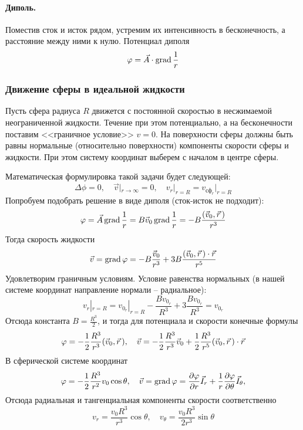 \paragraph{Диполь.} Поместив сток и исток рядом, устремим их интенсивность в бесконечность, а расстояние между ними к нулю. Потенциал диполя
\begin{equation}
    \varphi = \vec{A} \cdot \operatorname{grad} \frac{1}{r}
\end{equation}

\subsubsection{Движение сферы в идеальной жидкости}
Пусть сфера радиуса $R$ движется с постоянной скоростью в несжимаемой 
неограниченной жидкости. Течение при этом потенциально, а на бесконечности поставим <<граничное условие>> $v=0$. На поверхности сферы должны быть равны нормальные (относительно поверхности) компоненты скорости сферы и жидкости. При этом систему координат выберем с началом в центре сферы. 

Математическая формулировка такой задачи будет следующей:
\begin{equation}
    \Delta \phi = 0, \quad
    \vec{v} |_{r\to \infty}=0, \quad
    v_r |_{r=R}=v_{\text{сф}_r}|_{r=R}
\end{equation}
Попробуем подобрать решение в виде диполя (сток-исток не подходит):
\begin{equation}
    \varphi = \vec{A} \operatorname{grad} \frac{1}{r} = B \vec{v}_0 \operatorname{grad} \frac{1}{r}=
    -B \frac{\qty(\vec{v}_0,\vec{r}\,)}{r^3}
\end{equation}
Тогда скорость жидкости
\begin{equation}
    \vec{v} = \operatorname{grad} \varphi = -B \frac{\vec{v}_0}{r^3} +
    3B \frac{(\vec{v}_0,\vec{r}\,)\cdot \vec{r}}{r^5}
\end{equation}
Удовлетворим граничным условиям. Условие равенства нормальных (в нашей системе координат направление нормали -- радиальное):
\begin{equation}
    v_r |_{r=R}= v_{0_r}|_{r=R}
    -\frac{B{v_{0_r}}}{R^3}
    +3\frac{B v_{0_r}}{R^3} = v_{0_r} 
\end{equation}
Отсюда константа $B=\frac{R^3}{2}$, и тогда для потенциала и скорости конечные формулы
\begin{equation}
    \varphi = -\frac{1}{2} \frac{R^3}{r^3} \qty(\vec{v}_0,\vec{r}\,), \quad
    \vec{v} = -\frac{1}{2} \frac{R^3}{r^3} \vec{v}_0
    +\frac{1}{2} \frac{R^3}{r^5} (\vec{v}_0,\vec{r}\,)\cdot \vec{r}
\end{equation}
В сферической системе координат
\begin{equation}
    \varphi = -\frac{1}{2} \frac{R^3}{r^2} v_0 \cos\theta, \quad
    \vec{v} = \operatorname{grad}\varphi = \pdv{\varphi}{r} \vec{I}_r +
    \frac{1}{r} \pdv{\varphi}{\theta} \vec{I}_\theta,
\end{equation}
Отсюда радиальная и тангенциальная компоненты скорости соответственно
\begin{equation}
    v_r= \frac{v_0 R^3}{r^3}\cos\theta, \quad
    v_\theta = \frac{v_0 R^3}{2r^3} \sin\theta
\end{equation}


